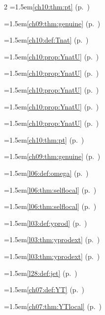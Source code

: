 \begin{multicols}{2}
\hangindent=1.5em\quad \ref{ch10:thm:pt} (p.~\pageref{ch10:thm:pt})\par
\hangindent=1.5em\quad \ref{ch09:thm:genuine} (p.~\pageref{ch09:thm:genuine})\par
\hangindent=1.5em\quad \ref{ch10:def:Tnat} (p.~\pageref{ch10:def:Tnat})\par
\hangindent=1.5em\quad \ref{ch10:prop:YnatU} (p.~\pageref{ch10:prop:YnatU})\par
\hangindent=1.5em\quad \ref{ch10:prop:YnatU} (p.~\pageref{ch10:prop:YnatU})\par
\hangindent=1.5em\quad \ref{ch10:prop:YnatU} (p.~\pageref{ch10:prop:YnatU})\par
\hangindent=1.5em\quad \ref{ch10:prop:YnatU} (p.~\pageref{ch10:prop:YnatU})\par
\hangindent=1.5em\quad \ref{ch10:prop:YnatU} (p.~\pageref{ch10:prop:YnatU})\par
\hangindent=1.5em\quad \ref{ch10:thm:pt} (p.~\pageref{ch10:thm:pt})\par
\hangindent=1.5em\quad \ref{ch09:thm:genuine} (p.~\pageref{ch09:thm:genuine})\par
\hangindent=1.5em\quad \ref{l06:def:omega} (p.~\pageref{l06:def:omega})\par
\hangindent=1.5em\quad \ref{l06:thm:selflocal} (p.~\pageref{l06:thm:selflocal})\par
\hangindent=1.5em\quad \ref{l06:thm:selflocal} (p.~\pageref{l06:thm:selflocal})\par
\hangindent=1.5em\quad \ref{l03:def:yprod} (p.~\pageref{l03:def:yprod})\par
\hangindent=1.5em\quad \ref{l03:thm:yprodext} (p.~\pageref{l03:thm:yprodext})\par
\hangindent=1.5em\quad \ref{l03:thm:yprodext} (p.~\pageref{l03:thm:yprodext})\par
\hangindent=1.5em\quad \ref{l28:def:jet} (p.~\pageref{l28:def:jet})\par
\hangindent=1.5em\quad \ref{ch07:def:YT} (p.~\pageref{ch07:def:YT})\par
\hangindent=1.5em\quad \ref{ch07:thm:YTlocal} (p.~\pageref{ch07:thm:YTlocal})\par

\end{multicols}
